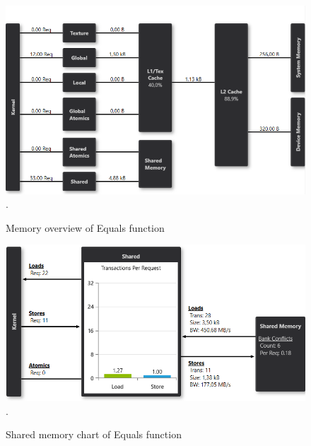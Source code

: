\documentclass[oneside,openright,12pt,final,en]{mgr}
\begin{document}
\begin{figure}[H]
	\centering
	\includegraphics[width=\textwidth]{equals_memory}.
	\caption{Memory overview of Equals function}
	\label{fig:equals_memory}
\end{figure}

\begin{figure}[H]
	\centering
	\includegraphics[width=\textwidth]{equals_shared}.
	\caption{Shared memory chart of Equals function}
	\label{fig:equals_shared}
\end{figure}
\end{document}
